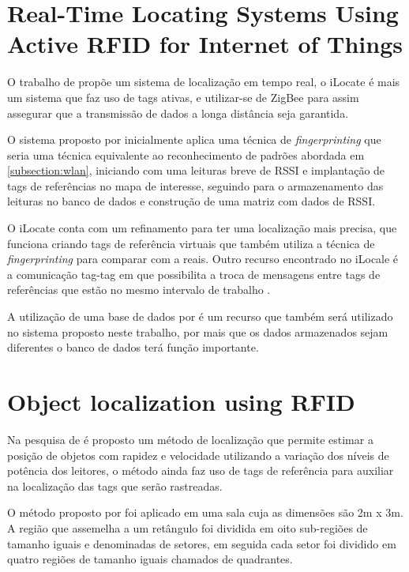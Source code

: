 \section{Real-Time Locating Systems Using Active RFID for Internet of Things}
O trabalho de  propõe um sistema de localização em tempo real, o iLocate é mais um sistema que faz uso de tags ativas, e  utilizar-se de ZigBee para assim assegurar que a transmissão de dados a longa distância seja garantida. 
\par
O sistema proposto por  inicialmente aplica uma técnica de \textit{fingerprinting} que seria uma técnica equivalente ao reconhecimento de padrões abordada em \autoref{subsection:wlan}, iniciando com uma leituras breve de RSSI e implantação de tags de referências no mapa de interesse, seguindo para o armazenamento das leituras no banco de dados e construção de uma matriz com dados de RSSI. 
\par 
O iLocate conta com um refinamento para ter uma localização mais precisa, que funciona criando tags de referência virtuais que também utiliza a técnica de \textit{fingerprinting} para comparar com a reais. Outro recurso encontrado no iLocale é a comunicação tag-tag em que possibilita a troca de mensagens entre tags de referências que estão no mesmo intervalo de trabalho \cite{realtimeRFID2016}.
\par
A utilização de uma base de dados por  é um recurso que também será utilizado no sistema proposto neste trabalho, por mais que os dados armazenados sejam diferentes o banco de dados terá função importante.

\section{Object localization using RFID}
Na pesquisa de  é proposto um método de localização que permite estimar a posição de objetos com rapidez e velocidade utilizando a variação dos níveis de potência dos leitores, o método ainda faz uso de tags de referência para auxiliar na localização das tags que serão rastreadas.

\par
O método proposto por  foi aplicado em uma sala cuja as dimensões são 2m x 3m. A região que assemelha a um retângulo foi dividida em oito sub-regiões de tamanho iguais e denominadas de setores, em seguida cada setor foi dividido em quatro regiões de tamanho iguais chamados de quadrantes.

